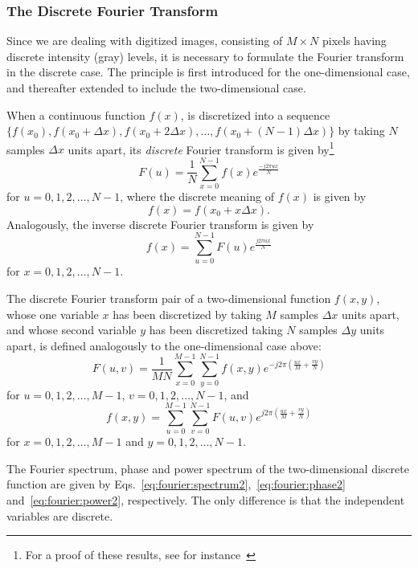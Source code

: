 \subsubsection{The Discrete Fourier Transform}

Since we are dealing with digitized images, consisting of $M\times N$
pixels having discrete intensity (gray) levels, it is necessary to
formulate the Fourier transform in the discrete case.  The principle
is first introduced for the one-dimensional case, and thereafter
extended to include the two-dimensional case.

When a continuous function $f(x)$, is discretized into a sequence
$\{f(x_{0}),f(x_{0}+\Delta x),f(x_{0}+2\Delta x),\ldots,
f(x_{0}+(N-1)\Delta x)\}$ by taking $N$ samples $\Delta x$ units
apart, its {\em discrete\/} Fourier transform is given by\footnote{For
  a proof of these results, see for instance~\cite{brigham}}
\begin{equation}
\label{eq:fourier:discrete}
  F(u)=\frac{1}{N}\sum_{x=0}^{N-1}f(x)e^{\frac{-j2\pi ux}{N}}
\end{equation}
for $u=0,1,2,\ldots,N-1$, where the discrete meaning of $f(x)$ is
given by
\begin{equation}
  f(x)=f(x_{0}+x\Delta x)\mbox{.}
\end{equation}
Analogously, the inverse discrete Fourier transform is given by
\begin{equation}
  f(x)=\sum_{u=0}^{N-1}F(u)e^{\frac{j2\pi ux}{N}}
\end{equation}
for $x=0,1,2,\ldots,N-1$.

The discrete Fourier transform pair of a two-dimensional function
$f(x,y)$, whose one variable $x$ has been discretized by taking $M$
samples $\Delta x$ units apart, and whose second variable $y$ has been
discretized taking $N$ samples $\Delta y$ units apart, is defined
analogously to the one-dimensional case above:
\begin{equation}
  F(u,v)=\frac{1}{MN}\sum_{x=0}^{M-1}\sum_{y=0}^{N-1}f(x,y)e^{-j2\pi
    (\frac{ux}{M}+\frac{vy}{N})} 
\end{equation}
for $u=0,1,2,\ldots,M-1$, $v=0,1,2,\ldots,N-1$, and
\begin{equation}
  f(x,y)=\sum_{u=0}^{M-1}\sum_{v=0}^{N-1}F(u,v)e^{j2\pi
    (\frac{ux}{M}+\frac{vy}{N})} 
\end{equation}
for $x=0,1,2,\ldots,M-1$ and $y=0,1,2,\ldots,N-1$.

The Fourier spectrum, phase and power spectrum of the two-dimensional
discrete function are given by
Eqs.~\ref{eq:fourier:spectrum2},~\ref{eq:fourier:phase2}
and~\ref{eq:fourier:power2}, respectively.  The only difference is
that the independent variables are discrete.

